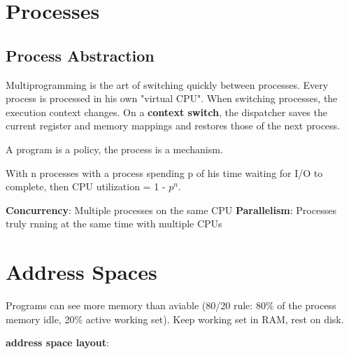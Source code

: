 \documentclass[11pt,a4paper]{article}
\begin{document}
	\section{Processes}
	
	\subsection{Process Abstraction}
	
	Multiprogramming is the art of switching quickly between processes. Every process is processed in his own "virtual CPU". When switching processes, the execution context changes. On a  \textbf{context switch}, the dispatcher saves the current register and memory mappings and restores those of the next process.
	
	A program is a policy, the process is a mechanism.
	
	With n processes with a process spending p of his time waiting for I/O to complete, then CPU utilization = 1 - ${p^n}$. \newline
	
	\textbf{Concurrency}: Multiple processes on the same CPU
	\textbf{Parallelism}: Processes truly rnning at the same time with multiple CPUs
	
	\section{Address Spaces}
	
	Programs can see more memory than aviable (80/20 rule: 80\% of the process memory idle, 20\% active working set). Keep working set in RAM, rest on disk.
	
	\textbf{address space layout}: 
	
	
	\newpage
	
	\printglossaries
	
	
	
\end{document}
